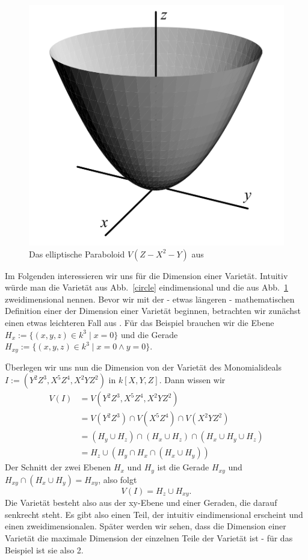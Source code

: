 \documentclass{article}
\begin{document}
	\begin{figure}[ht]
		\centering
		\includegraphics[width=.5\linewidth]{paraboloid.png}
		\caption{Das elliptische Paraboloid \(V(Z - X^2 -Y)\) aus \cite{CLOS}}
		\label{paraboloid}
	\end{figure}

	Im Folgenden interessieren wir uns für die Dimension einer Varietät. Intuitiv würde man
	die Varietät aus Abb.~\ref{circle} eindimensional und die aus Abb.~\ref{paraboloid}
	zweidimensional nennen. Bevor wir mit der - etwas längeren - mathematischen Definition einer
	der Dimension einer Varietät beginnen, betrachten wir zunächst einen etwas leichteren Fall 
	aus \cite{CLOS}.
	Für das Beispiel brauchen wir die Ebene \(H_x := \{(x,y,z) \in k^3\;|\; x = 0\}\) und die
	Gerade \(H_{xy} := \{(x,y,z) \in k^3\;|\; x=0 \wedge y=0\}\).

	Überlegen wir uns nun die Dimension von der Varietät des Monomialideals
	\(I := (Y^2Z^3, X^5Z^4, X^2YZ^2)\) in \(k[X,Y,Z]\). Dann wissen wir
	\begin{align*}
		V(I) &= V(Y^2Z^3, X^5Z^4, X^2YZ^2) \\
		&= V(Y^2Z^3) \cap V(X^5Z^4) \cap V(X^2YZ^2) \\
		&= (H_y \cup H_z) \cap (H_x \cup H_z) \cap (H_x \cup H_y \cup H_z) \\
		&= H_z \cup (H_y \cap H_x \cap (H_x \cup H_y))
	\end{align*}
	Der Schnitt der zwei Ebenen \(H_x\) und \(H_y\) ist die Gerade \(H_{xy}\) und
	\(H_{xy} \cap (H_x \cup H_y) = H_{xy}\), also folgt
	\begin{displaymath}
		V(I) = H_z \cup H_{xy}.
	\end{displaymath}
	Die Varietät besteht also aus der xy-Ebene und einer Geraden, die darauf senkrecht steht.
	Es gibt also einen Teil, der intuitiv eindimensional erscheint und einen zweidimensionalen.
	Später werden wir sehen, dass die Dimension einer Varietät die maximale Dimension der einzelnen
	Teile der Varietät ist - für das Beispiel ist sie also 2.
\end{document}
